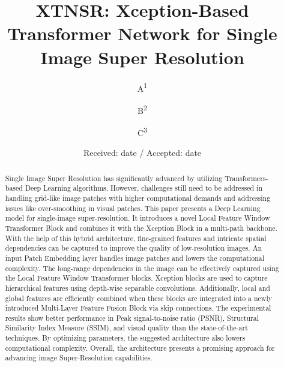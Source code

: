 \documentclass[twocolumn]{svjour3}          %
\begin{document}
\title{XTNSR: Xception-Based Transformer Network for Single Image Super Resolution%
}

\author{A\textsuperscript{1}\and
        B\textsuperscript{2} \and 
	C\textsuperscript{3}
}

\date{Received: date / Accepted: date}

\maketitle


\begin{abstract}
Single Image Super Resolution has significantly advanced by utilizing Transformers-based Deep Learning algorithms. However, challenges still need to be addressed in handling grid-like image patches with higher computational demands and addressing issues like over-smoothing in visual patches. This paper presents a Deep Learning model for single-image super-resolution. It introduces a novel Local Feature Window Transformer Block and combines it with the Xception Block in a multi-path backbone. With the help of this hybrid architecture, fine-grained features and intricate spatial dependencies can be captured to improve the quality of low-resolution images. An input Patch Embedding layer handles image patches and lowers the computational complexity. The long-range dependencies in the image can be effectively captured using the Local Feature Window Transformer blocks. Xception blocks are used to capture hierarchical features using depth-wise separable convolutions. Additionally, local and global features are efficiently combined when these blocks are integrated into a newly introduced Multi-Layer Feature Fusion Block via skip connections. The experimental results show better performance in Peak signal-to-noise ratio (PSNR), Structural Similarity Index Measure (SSIM), and visual quality than the state-of-the-art techniques. By optimizing parameters, the suggested architecture also lowers computational complexity. Overall, the architecture presents a promising approach for advancing image Super-Resolution capabilities.


\end{abstract}
\end{document}
